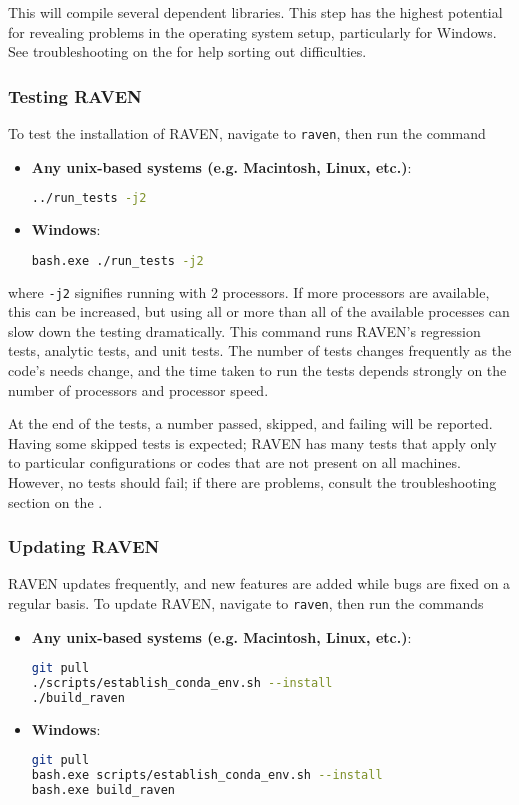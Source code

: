 This will compile several dependent libraries.  This step has the highest potential for revealing problems in
the operating system setup, particularly for Windows.  See troubleshooting on the \wiki for help sorting out
difficulties.


\subsubsection{Testing RAVEN}
\label{sec:testing raven}
To test the installation of RAVEN, navigate to \texttt{raven}, then run the command

\begin{itemize}

  \item \textbf{Any unix-based systems (e.g. Macintosh, Linux, etc.)}:
\begin{lstlisting}[language=bash]
../run_tests -j2
\end{lstlisting}
  \item \textbf{Windows}:
  \begin{lstlisting}[language=bash]
bash.exe ./run_tests -j2
\end{lstlisting}
  
\end{itemize}

where \texttt{-j2} signifies running with 2 processors.  If more processors are available, this can be
increased, but using all or more than all of the available processes can slow down the testing dramatically.
This command runs RAVEN's regression tests, analytic tests, and unit tests.  The number of tests changes
frequently as the code's needs change, and the time taken to run the tests depends strongly on the number of
processors and processor speed.

At the end of the tests, a number passed, skipped, and failing will be reported.  Having some skipped tests is
expected; RAVEN has many tests that apply only to particular configurations or codes that are not present on
all machines.  However, no tests should fail; if there are problems, consult the troubleshooting section on
the \wiki.


\subsubsection{Updating RAVEN}
RAVEN updates frequently, and new features are added while bugs are fixed on a regular basis.  To update
RAVEN, navigate to \texttt{raven}, then run the commands
\begin{itemize}

  \item \textbf{Any unix-based systems (e.g. Macintosh, Linux, etc.)}:
\begin{lstlisting}[language=bash]
git pull
./scripts/establish_conda_env.sh --install
./build_raven
\end{lstlisting}
  \item \textbf{Windows}:
  \begin{lstlisting}[language=bash]
git pull
bash.exe scripts/establish_conda_env.sh --install
bash.exe build_raven
\end{lstlisting}
  
\end{itemize}

